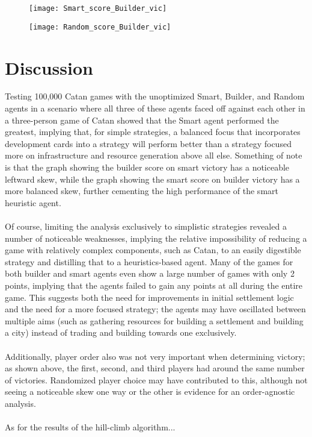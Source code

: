\documentclass[a4paper, 11pt]{article}
\begin{document}
\begin{figure}
\centering
\begin{minipage}{.5\textwidth}
  \centering
  \texttt{[image: Smart\_score\_Builder\_vic]}
  \label{fig:test1}
\end{minipage}%
\begin{minipage}{.5\textwidth}
  \centering
  \texttt{[image: Random\_score\_Builder\_vic]}
  \label{fig:test2}
\end{minipage}
\end{figure}

\section{Discussion}

Testing 100,000 Catan games with the unoptimized Smart, Builder, and Random agents in a scenario where all three of these agents faced off against each other in a three-person game of Catan showed that the Smart agent performed the greatest, implying that, for simple strategies, a balanced focus that incorporates development cards into a strategy will perform better than a strategy focused more on infrastructure and resource generation above all else. Something of note is that the graph showing the builder score on smart victory has a noticeable leftward skew, while the graph showing the smart score on builder victory has a more balanced skew, further cementing the high performance of the smart heuristic agent.
\\ \\
\noindent Of course, limiting the analysis exclusively to simplistic strategies revealed a number of noticeable weaknesses, implying the relative impossibility of reducing a game with relatively complex components, such as Catan, to an easily digestible strategy and distilling that to a heuristics-based agent. Many of the games for both builder and smart agents even show a large number of games with only 2 points, implying that the agents failed to gain any points at all during the entire game. This suggests both the need for improvements in initial settlement logic and the need for a more focused strategy; the agents may have oscillated between multiple aims (such as gathering resources for building a settlement and building a city) instead of trading and building towards one exclusively. 
\\ \\
\noindent Additionally, player order also was not very important when determining victory; as shown above, the first, second, and third players had around the same number of victories. Randomized player choice may have contributed to this, although not seeing a noticeable skew one way or the other is evidence for an order-agnostic analysis.
\\ \\
\noindent As for the results of the hill-climb algorithm...
\end{document}
